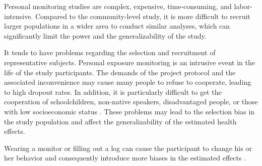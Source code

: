 \documentclass[11pt]{article}
\begin{document}
\begin{itemize*}
{\begin{enumerate*}[{[(1)]}]
            \item Personal monitoring studies are complex, expensive, time-consuming, and labor-intensive. Compared to the community-level study, it is more difficult to recruit larger populations in a wider area to conduct similar analyses, which can significantly limit the power and the generalizability of the study. 
            \item It tends to have problems regarding the selection and recruitment of representative subjects. Personal exposure monitoring is an intrusive event in the life of the study participants. The demands of the project protocol and the associated inconvenience may cause many people to refuse to cooperate, leading to high dropout rates. In addition, it is particularly difficult to get the cooperation of schoolchildren, non-native speakers, disadvantaged people, or those with low socioeconomic status \citep{watson1988air}. These problems may lead to the selection bias in the study population and affect the generalizability of the estimated health effects. 
            \item Wearing a monitor or filling out a log can cause the participant to change his or her behavior and consequently introduce more biases in the estimated effects \citep{ryan1986estimating}.
        \end{enumerate*}
    }
\end{itemize*}
\end{document}
